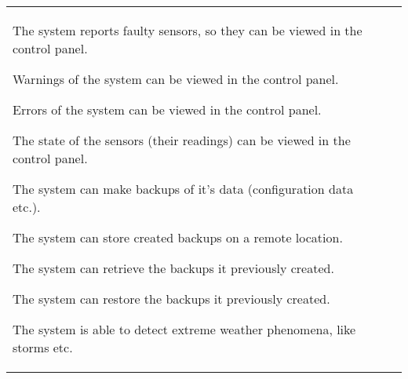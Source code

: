 \begin{longtable}{L{0.1\textwidth} L{0.12\textwidth} L{0.78\textwidth}}
    { The system reports faulty sensors, so they can be viewed in the control panel. }
    
    { Warnings of the system can be viewed in the control panel. }

	{ Errors of the system can be viewed in the control panel. }
	
	{ The state of the sensors (their readings) can be viewed in the control panel. }
    
    
    { The system can make backups of it's data (configuration data etc.). }
    
    { The system can store created backups on a remote location. }
      
    { The system can retrieve the backups it previously created. }
    
    { The system can restore the backups it previously created. }

    { The system is able to detect extreme weather phenomena, like storms etc. }
    
    \bottomrule
\end{longtable}